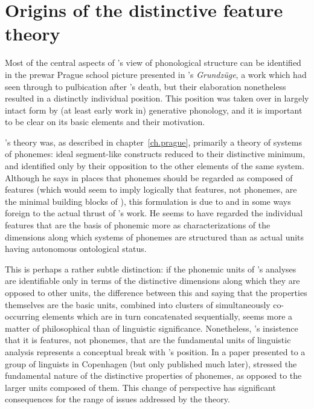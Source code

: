 \section{Origins of the distinctive feature theory}

Most of the central aspects of {\Jakobson}'s view of phonological
structure can be identified in the prewar Prague school picture
presented in {\Trubetzkoy}'s \textsl{Grund\-züge}, a work which {\Jakobson}
had seen through to pulbication after {\Trubetzkoy}'s death, but their
elaboration nonetheless resulted in a distinctly individual
position. This position was taken over in largely intact form by (at
least early work in) generative phonology, and it is important to be
clear on its basic elements and their motivation.

{\Trubetzkoy}'s theory was, as described in chapter~\ref{ch.prague},
primarily a theory of systems of phonemes: ideal segment-like
constructs reduced to their distinctive minimum, and identified only
by their opposition to the other elements of the same system. Although
he says in places that phonemes should be regarded as composed of
features (which would seem to imply logically that features, not
pho\-nemes, are the minimal building blocks of ), this
formulation is due to {\Jakobson} and in some ways foreign to the actual
thrust of {\Trubetzkoy}'s work. He seems to have regarded the individual
features that are the basis of phonemic  more as
characterizations of the dimensions along which systems of phonemes
are structured than as actual units having autonomous ontological
status.

This is perhaps a rather subtle distinction: if the phonemic units of
{\Trubetzkoy}'s analyses are identifiable only in terms of the
distinctive dimensions along which they are opposed to other units,
the difference between this and saying that the properties themselves
are the basic units, combined into clusters of simultaneously
co-occurring elements which are in turn concatenated sequentially,
seems more a matter of philosophical than of linguistic
significance. Nonetheless, {\Jakobson}'s insistence that it is features,
not phonemes, that are the fundamental units of linguistic analysis
represents a conceptual break with {\Trubetzkoy}'s position. In a paper
presented to a group of linguists in Copenhagen (but only published
much later), \citet{jakobson39:struktur} stressed the fundamental
nature of the distinctive properties of phonemes, as opposed to the
larger units composed of them. This change of perspective has
significant consequences for the range of issues addressed by the
theory.

